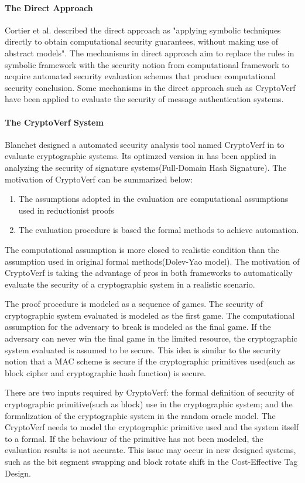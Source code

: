 \documentclass{article}
\begin{document}
\paragraph{The Direct Approach}
Cortier et al. described the direct approach as "applying symbolic techniques directly to obtain computational security guarantees, without making use of abstract models". The mechanisms in direct approach aim to replace the rules in symbolic framework with the security notion from computational framework to acquire automated security evaluation schemes that produce computational security conclusion. Some mechanisms in the direct approach such as CryptoVerf have been applied to evaluate the security of message authentication systems.
\paragraph{The CryptoVerf System}
Blanchet designed a automated security analysis tool named CryptoVerf in \cite{cryptoverf} to evaluate cryptographic systems. Its optimzed version in \cite{auto_verf} has been applied in analyzing the security of signature systems(Full-Domain Hash Signature). 
The motivation of CryptoVerf can be summarized below:
\begin{enumerate}
	\item The assumptions adopted in the evaluation are computational assumptions used in reductionist proofs
	\item The evaluation procedure is based the formal methods to achieve automation.
\end{enumerate}
The computational assumption is more closed to realistic condition than the assumption used in original formal methods(Dolev-Yao model).  The motivation of CryptoVerf is taking the advantage of pros in both frameworks to automatically evaluate the security of a cryptographic system in a realistic scenario. 

The proof procedure is modeled as a sequence of games. The security of cryptographic system evaluated is modeled as the first game. The computational assumption for the adversary to break is modeled as the final game. If the adversary can never win the final game in the limited resource, the cryptographic system evaluated is assumed to be secure. This idea is similar to the security notion that a MAC scheme is secure if the cryptographic primitives used(such as block cipher and cryptographic hash function) is secure.

There are two inputs required by CryptoVerf: the formal definition of security of cryptographic primitive(such as block) use in the cryptographic system; and the formalization of the cryptographic system in the random oracle model. 
The CryptoVerf needs to model the cryptographic primitive used and the system itself to a formal. If the behaviour of the primitive has not been modeled, the evaluation results is not accurate. This issue may occur in new designed systems, such as the bit segment swapping and block rotate shift in the Cost-Effective Tag Design\cite{cetd}.
 

\end{document}

